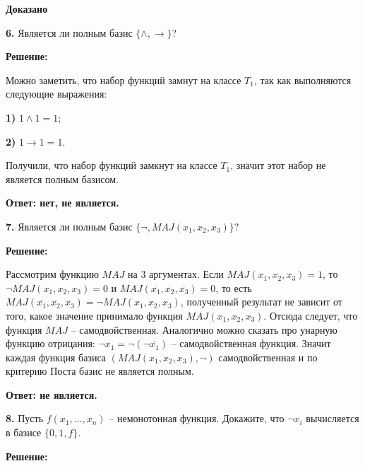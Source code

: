 \documentclass[a4paper,12pt]{article} %
\begin{document}
\begin{flushright}
\begin{large}
\textbf {Доказано}
\end{large}
\end{flushright}

{\bf 6.} Является ли полным базис $\{ \wedge, \rightarrow \}$?
\begin{center}
\bfseries
{\Large Решение: }
\end{center}

Можно заметить, что набор функций замнут на классе $T_1$, так как выполняются следующие выражения:

{\bf 1)} $1 \wedge 1 = 1$;

{\bf 2)} $1 \rightarrow 1 = 1$.

Получили, что набор функций замкнут на классе $T_1$, значит этот набор не является полным базисом.

\begin{flushright}
\begin{large}
\textbf {Ответ: нет, не является.}
\end{large}
\end{flushright}

{\bf 7.} Является ли полным базис $\{\neg, MAJ(x_1, x_2, x_3)\}$?
\begin{center}
\bfseries
{\Large Решение: }
\end{center}

Рассмотрим функцию $MAJ$ на $3$ аргументах. Если $MAJ(x_1,x_2,x_3) = 1$, то $\neg MAJ(x_1,x_2,x_3) = 0$ и $MAJ(\overline{x_1},\overline{x_2},\overline{x_3}) = 0$, то есть $MAJ(\overline{x_1},\overline{x_2},\overline{x_3}) = \neg MAJ(x_1,x_2,x_3)$, полученный результат не зависит от того, какое значение принимало функция $MAJ(x_1,x_2,x_3)$. Отсюда следует, что функция $MAJ$ -- самодвойственная. Аналогично можно сказать про унарную функцию отрицания: $\neg x_1 = \neg ( \neg\overline{x_1})$ -- самодвойственная функция. Значит каждая функция базиса $(MAJ(x_1,x_2,x_3), \neg)$ самодвойственная и по критерию Поста базис не является полным.

\begin{flushright}
\begin{large}
\textbf {Ответ: не является.}
\end{large}
\end{flushright}

{\bf 8.} Пусть $f(x_1, ..., x_n)$ -- немонотонная функция. Докажите, что $\neg x_i $ вычисляется в базисе $\{0,1,f \}$.
\begin{center}
\bfseries
{\Large Решение: }
\end{center}
\end{document}
